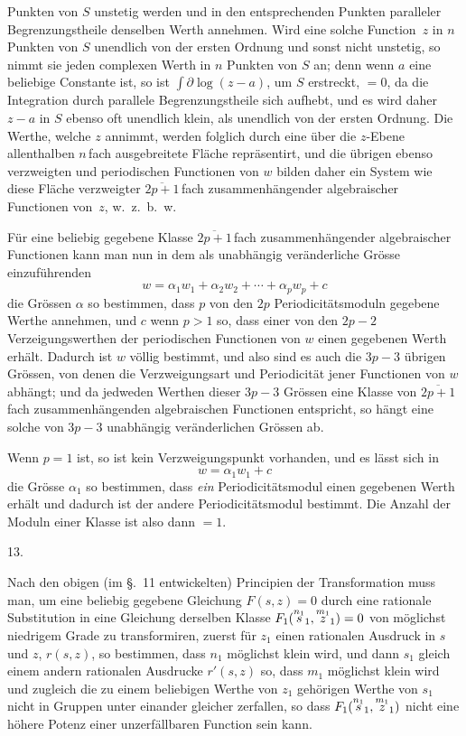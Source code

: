 \documentclass[a4paper,12pt,leqno]{article}
\begin{document}
Punkten von $S$ unstetig werden und in den entsprechenden
Punkten paralleler Begrenzungstheile denselben Werth annehmen.
Wird eine solche Function~$z$ in $n$ Punkten von $S$ unendlich
von der ersten Ordnung und sonst nicht unstetig, so nimmt sie
jeden complexen Werth in $n$ Punkten von $S$ an; denn wenn $a$
eine beliebige Constante ist, so ist
$\int \partial \log (z - a)$,
um $S$ erstreckt, $= 0$, da die Integration durch parallele
Begrenzungstheile sich aufhebt, und es wird daher $z - a$ in $S$
ebenso oft unendlich klein, als unendlich von der ersten Ordnung.
Die Werthe, welche $z$ annimmt, werden folglich durch eine
\"{u}ber die $z$-Ebene allenthalben $n \,$\-fach ausgebreitete
Fl\"{a}che repr\"{a}sentirt, und die \"{u}brigen ebenso
verzweigten und periodischen Functionen von $w$ bilden daher ein
System wie diese Fl\"{a}che verzweigter $\overline{2p + 1} \,$\-fach
zusammenh\"{a}ngender algebraischer Functionen von~$z$,
w.~z.~b.~w.

F\"{u}r eine beliebig gegebene Klasse $\overline{2p + 1} \,$\-fach
zusammenh\"{a}ngender algebraischer Functionen kann man nun in
dem als unabh\"{a}ngig ver\"{a}nderliche Gr\"{o}sse
einzuf\"{u}hrenden
\[ w = \alpha_1 w_1 + \alpha_2 w_2 + \cdots + \alpha_p w_p + c \]
die Gr\"{o}ssen $\alpha$ so bestimmen, dass $p$ von den $2p$
Periodicit\"{a}tsmoduln gegebene Werthe annehmen, und $c$ wenn
$p > 1$ so, dass einer von den $2p - 2$ Verzeigungswerthen der
periodischen Functionen von $w$ einen gegebenen Werth erh\"{a}lt.
Dadurch ist $w$ v\"{o}llig bestimmt, und also sind es auch die
$3p - 3$ \"{u}brigen Gr\"{o}ssen, von denen die Verzweigungsart
und Periodicit\"{a}t jener Functionen von $w$ abh\"{a}ngt; und da
jedweden Werthen dieser $3p - 3$ Gr\"{o}ssen eine Klasse von
$\overline{2p + 1} \,$\-fach zusammenh\"{a}ngenden algebraischen Functionen
entspricht, so h\"{a}ngt eine solche von $3p - 3$ unabh\"{a}ngig
ver\"{a}nderlichen Gr\"{o}ssen ab.

Wenn $p = 1$ ist, so ist kein Verzweigungspunkt vorhanden, und es
l\"{a}sst sich in
\[ w = \alpha_1 w_1 + c \]
die Gr\"{o}sse $\alpha_1$ so bestimmen, dass \emph{ein}
Periodicit\"{a}tsmodul einen gegebenen Werth erh\"{a}lt und
dadurch ist der andere Periodicit\"{a}tsmodul bestimmt.  Die
Anzahl der Moduln einer Klasse ist also dann $= 1$.

\medbreak

\centerline{13.}

\nobreak\medskip

Nach den obigen (im \S.~11 entwickelten) Principien der
Transformation muss man, um eine beliebig gegebene Gleichung
$F(s,z) = 0$ durch eine rationale Substitution in eine Gleichung
derselben Klasse
$F_1( {\buildrel n_1 \over s_1}, {\buildrel m_1 \over z_1} ) = 0$
von m\"{o}glichst niedrigem Grade zu transformiren, zuerst
f\"{u}r $z_1$ einen rationalen Ausdruck in $s$ und $z$, $r(s,z)$,
so bestimmen, dass $n_1$ m\"{o}glichst klein wird, und dann $s_1$
gleich einem andern rationalen Ausdrucke $r'(s,z)$ so, dass $m_1$
m\"{o}glichst klein wird und zugleich die zu einem beliebigen
Werthe von $z_1$ geh\"{o}rigen Werthe von $s_1$ nicht in Gruppen
unter einander gleicher zerfallen, so dass
$F_1( {\buildrel n_1 \over s_1}, {\buildrel m_1 \over z_1} )$
nicht eine h\"{o}here Potenz einer unzerf\"{a}llbaren Function
sein kann.
\end{document}
